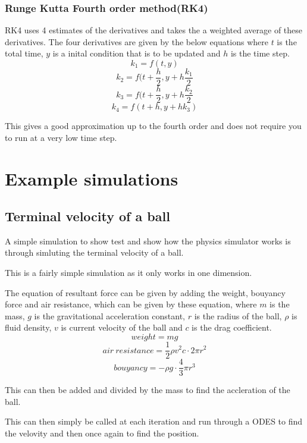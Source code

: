 \documentclass[12pt, a2paper]{article}
\begin{document}
\subsubsection{Runge Kutta Fourth order method(RK4)}
RK4 uses 4 estimates of the derivatives and takes the a weighted average of these derivatives. The four derivatives are given by the below equations where \(t\) is the total time, \(y\) is a inital condition that is to be updated and \(h\) is the time step. 
\[k_{1} = f(t,y)\]
\[k_{2} = f(t+\frac{h}{2},y+h\frac{k_{1}}{2}\]
\[k_{3} = f(t+\frac{h}{2},y+h\frac{k_{2}}{2}\]
\[k_{4} = f(t+h,y+hk_{3})\]

This gives a good approximation up to the fourth order and does not require you to run at a very low time step.

\section{Example simulations}
\subsection{Terminal velocity of a ball}
A simple simulation to show test and show how the physics simulator works is through simluting the terminal velocity of a ball.

This is a fairly simple simulation as it only works in one dimension.

The equation of resultant force can be given by adding the weight, bouyancy force and air resistance, which can be given by these equation, where \(m\) is the mass, \(g\) is the gravitational acceleration constant, \(r\) is the radius of the ball, \(\rho\) is fluid density, \(v\) is current velocity of the ball and \(c\) is the drag coefficient.
\[weight = mg\]
\[air\:resistance = \frac{1}{2}\rho v^2 c\cdot 2\pi r^2\]
\[bouyancy = -\rho g \cdot\frac{4}{3}\pi r^3\]

This can then be added and divided by the mass to find the accleration of the ball.

This can then simply be called at each iteration and run through a ODES to find the velovity and then once again to find the position.
\end{document}
